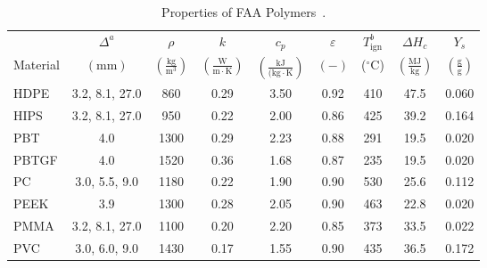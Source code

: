 \begin{table}[!h]
\caption[Properties of FAA Polymers]{Properties of FAA Polymers~\cite{Stoliarov:CF2009,Stoliarov:FM2012}.}
\centering
\begin{tabular}{|p{2.5cm}|c|c|c|c|c|c|c|c|}
\hline
            & \centering$\Delta^{a}$& \centering$\rho$& \centering$k$& \centering$c_{p}$& \centering$\varepsilon$& \centering$T_{\mathrm{ign}}^{b}$&\centering$\Delta H_{c}$& $Y_{s}$ \\
Material    & \centering$\mathrm{\left(mm\right)}$ & \centering$\mathrm{\left(\frac{kg}{m^{3}}\right)}$ & \centering$\mathrm{\left(\frac{W}{m\cdot K}\right)}$ & \centering$\mathrm{\left(\frac{kJ}{(kg\cdot K}\right)}$ & \centering$\mathrm{( - )}$ &  \centering($\mathrm{^{\circ}C}$)   & \centering$\left(\mathrm{\frac{MJ}{kg}}\right)$ & $\mathrm{\left(\frac{g}{g}\right)}$ \\ \hline
\hline
HDPE                                              & 3.2, 8.1, 27.0 & 860  & 0.29 & 3.50 & 0.92 & 410 & 47.5 & 0.060 \\\hline
HIPS                                              & 3.2, 8.1, 27.0 & 950  & 0.22 & 2.00 & 0.86 & 425 & 39.2 & 0.164 \\\hline
PBT                                               & 4.0            & 1300 & 0.29 & 2.23 & 0.88 & 291 & 19.5 & 0.020 \\\hline
PBTGF                                             & 4.0            & 1520 & 0.36 & 1.68 & 0.87 & 235 & 19.5 & 0.020 \\\hline
PC                                                & 3.0, 5.5, 9.0  & 1180 & 0.22 & 1.90 & 0.90 & 530 & 25.6 & 0.112 \\\hline
PEEK                                              & 3.9            & 1300 & 0.28 & 2.05 & 0.90 & 463 & 22.8 & 0.020 \\\hline
PMMA                                              & 3.2, 8.1, 27.0 & 1100 & 0.20 & 2.20 & 0.85 & 373 & 33.5 & 0.022 \\\hline
PVC                                               & 3.0, 6.0, 9.0  & 1430 & 0.17 & 1.55 & 0.90 & 435 & 36.5 & 0.172 \\\hline
\end{tabular}
\label{Properties_FAA_Polymers_All}
\end{table}
\vspace{-0.4cm}
\\
 \\

